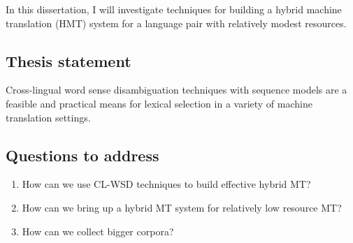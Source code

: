 In this dissertation, I will investigate techniques for building a hybrid
machine translation (HMT) system for a language pair with relatively modest
resources.

\subsection{Thesis statement}
Cross-lingual word sense disambiguation techniques with sequence models are a
feasible and practical means for lexical selection in a variety of machine
translation settings.

\subsection{Questions to address}
\begin{enumerate}
\item How can we use CL-WSD techniques to build effective hybrid MT?
\item How can we bring up a hybrid MT system for relatively low resource MT?
\item How can we collect bigger corpora?
\end{enumerate}


